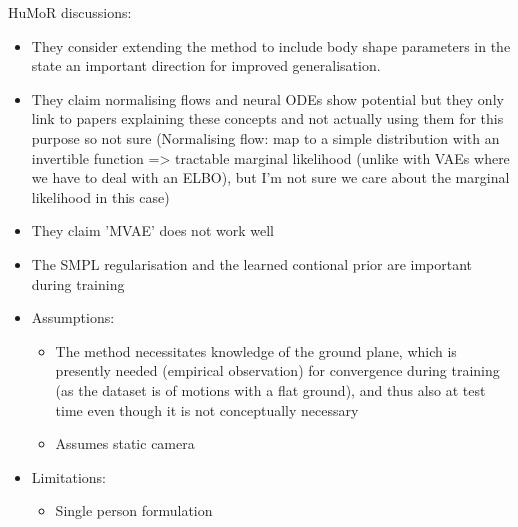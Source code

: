 HuMoR discussions:
\begin{itemize}
    \item They consider extending the method to include body shape parameters in the state an important direction for improved generalisation.
    \item They claim normalising flows and neural ODEs show potential but they only link to papers explaining these concepts and not actually using them for this purpose so not sure (Normalising flow: map to a simple distribution with an invertible function => tractable marginal likelihood (unlike with VAEs where we have to deal with an ELBO), but I'm not sure we care about the marginal likelihood in this case)
    \item They claim 'MVAE' does not work well
    \item The SMPL regularisation and the learned contional prior are important during training
    \item Assumptions:
    \begin{itemize}
        \item The method necessitates knowledge of the ground plane, which is presently needed (empirical observation) for convergence during training (as the dataset is of motions with a flat ground), and thus also at test time even though it is not conceptually necessary
        \item Assumes static camera
    \end{itemize}
    \item Limitations:
    \begin{itemize}
        \item Single person formulation
    \end{itemize}
\end{itemize}


